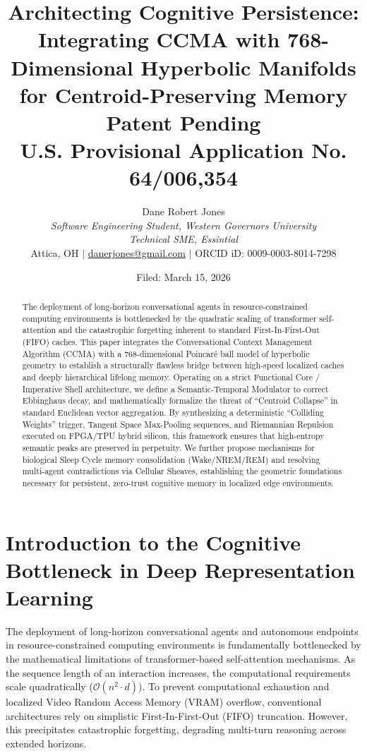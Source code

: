 \documentclass[11pt, a4paper]{article}
\title{
    \textbf{Architecting Cognitive Persistence: Integrating CCMA with 768-Dimensional Hyperbolic Manifolds for Centroid-Preserving Memory} \\
    \vspace{0.5cm}
    \large \textbf{Patent Pending} \\
    \small U.S. Provisional Application No. 64/006,354
}
\author{
	Dane Robert Jones \\ 
	\textit{Software Engineering Student, Western Governors University} \\ 
	\textit{Technical SME, Essintial} \\
	Attica, OH $\vert$ \href{mailto:danerjones@gmail.com}{danerjones@gmail.com} $\vert$ ORCID iD: 0009-0003-8014-7298
}
\date{Filed: March 15, 2026}
\begin{document}
	
	\maketitle
	
	\begin{abstract}
		The deployment of long-horizon conversational agents in resource-constrained computing environments is bottlenecked by the quadratic scaling of transformer self-attention and the catastrophic forgetting inherent to standard First-In-First-Out (FIFO) caches. This paper integrates the Conversational Context Management Algorithm (CCMA) with a 768-dimensional Poincaré ball model of hyperbolic geometry to establish a structurally flawless bridge between high-speed localized caches and deeply hierarchical lifelong memory. Operating on a strict Functional Core / Imperative Shell architecture, we define a Semantic-Temporal Modulator to correct Ebbinghaus decay, and mathematically formalize the threat of ``Centroid Collapse'' in standard Euclidean vector aggregation. By synthesizing a deterministic ``Colliding Weights'' trigger, Tangent Space Max-Pooling sequences, and Riemannian Repulsion executed on FPGA/TPU hybrid silicon, this framework ensures that high-entropy semantic peaks are preserved in perpetuity. We further propose mechanisms for biological Sleep Cycle memory consolidation (Wake/NREM/REM) and resolving multi-agent contradictions via Cellular Sheaves, establishing the geometric foundations necessary for persistent, zero-trust cognitive memory in localized edge environments.
	\end{abstract}
	
	\vspace{0.5cm}
	
	\section{Introduction to the Cognitive Bottleneck in Deep Representation Learning}
	The deployment of long-horizon conversational agents and autonomous endpoints in resource-constrained computing environments is fundamentally bottlenecked by the mathematical limitations of transformer-based self-attention mechanisms. As the sequence length of an interaction increases, the computational requirements scale quadratically ($\mathcal{O}(n^2 \cdot d)$). To prevent computational exhaustion and localized Video Random Access Memory (VRAM) overflow, conventional architectures rely on simplistic First-In-First-Out (FIFO) truncation. However, this precipitates catastrophic forgetting, degrading multi-turn reasoning across extended horizons.
	
\end{document}
